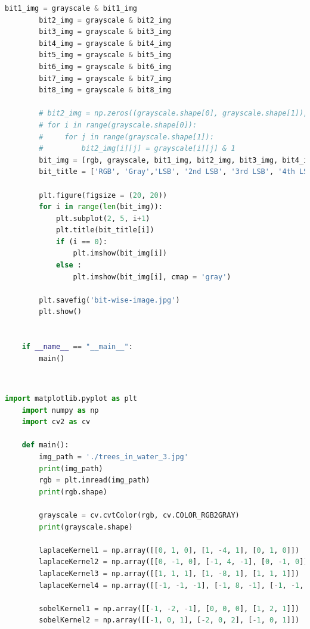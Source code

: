 \documentclass{article}
\begin{document}
{\begin{lstlisting}[language=Python, caption=Code for bit slicing a grayscale image]
        bit1_img = grayscale & bit1_img
        bit2_img = grayscale & bit2_img
        bit3_img = grayscale & bit3_img
        bit4_img = grayscale & bit4_img
        bit5_img = grayscale & bit5_img
        bit6_img = grayscale & bit6_img
        bit7_img = grayscale & bit7_img
        bit8_img = grayscale & bit8_img
        
        # bit2_img = np.zeros((grayscale.shape[0], grayscale.shape[1]), dtype = np.uint8)
        # for i in range(grayscale.shape[0]):
        #     for j in range(grayscale.shape[1]):
        #         bit2_img[i][j] = grayscale[i][j] & 1
        bit_img = [rgb, grayscale, bit1_img, bit2_img, bit3_img, bit4_img, bit5_img, bit6_img, bit7_img, bit8_img]
        bit_title = ['RGB', 'Gray','LSB', '2nd LSB', '3rd LSB', '4th LSB', '4th MSB', '3rd MSB', '2nd MSB', 'MSB'] 
        
        plt.figure(figsize = (20, 20))
        for i in range(len(bit_img)):
            plt.subplot(2, 5, i+1)
            plt.title(bit_title[i])
            if (i == 0):
                plt.imshow(bit_img[i])
            else :
                plt.imshow(bit_img[i], cmap = 'gray')
    
        plt.savefig('bit-wise-image.jpg')
        plt.show()
    
    
    if __name__ == "__main__":
        main()

    \end{lstlisting}
    \\
    \lstset{style=mystyle}
    \begin{lstlisting}[language=Python, caption=Code for laplacian filtering and sobel filtering on a grayscale image]
    import matplotlib.pyplot as plt
    import numpy as np
    import cv2 as cv
    
    def main():
        img_path = './trees_in_water_3.jpg'
        print(img_path)
        rgb = plt.imread(img_path)
        print(rgb.shape)
    
        grayscale = cv.cvtColor(rgb, cv.COLOR_RGB2GRAY)
        print(grayscale.shape)
    
        laplaceKernel1 = np.array([[0, 1, 0], [1, -4, 1], [0, 1, 0]])
        laplaceKernel2 = np.array([[0, -1, 0], [-1, 4, -1], [0, -1, 0]])
        laplaceKernel3 = np.array([[1, 1, 1], [1, -8, 1], [1, 1, 1]])
        laplaceKernel4 = np.array([[-1, -1, -1], [-1, 8, -1], [-1, -1, -1]])
    
        sobelKernel1 = np.array([[-1, -2, -1], [0, 0, 0], [1, 2, 1]])
        sobelKernel2 = np.array([[-1, 0, 1], [-2, 0, 2], [-1, 0, 1]])
    

\end{lstlisting}}
\end{document}

